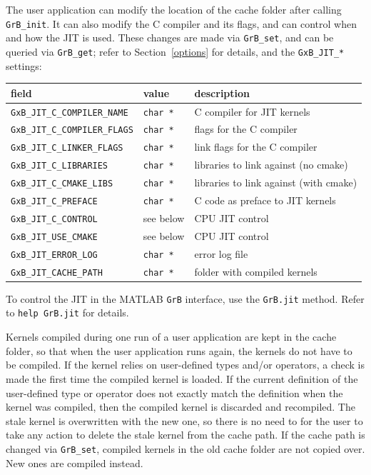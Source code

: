 The user application can modify the location of the cache folder after calling
\verb'GrB_init'.  It can also modify the C compiler and its flags, and can
control when and how the JIT is used.  These changes are made via
\verb'GrB_set', and can be queried via \verb'GrB_get'; refer to
Section~\ref{options} for details, and the \verb'GxB_JIT_*' settings:

\vspace{0.15in}
{\footnotesize
\begin{tabular}{lll}
\hline
field                       & value         & description \\
\hline
\verb'GxB_JIT_C_COMPILER_NAME' & \verb'char *' & C compiler for JIT kernels \\
\verb'GxB_JIT_C_COMPILER_FLAGS'& \verb'char *' & flags for the C compiler \\
\verb'GxB_JIT_C_LINKER_FLAGS' & \verb'char *' & link flags for the C compiler \\
\verb'GxB_JIT_C_LIBRARIES'    & \verb'char *' & libraries to link against (no cmake) \\
\verb'GxB_JIT_C_CMAKE_LIBS'   & \verb'char *' & libraries to link against (with cmake) \\
\verb'GxB_JIT_C_PREFACE'      & \verb'char *' & C code as preface to JIT kernels \\
\verb'GxB_JIT_C_CONTROL'      & see below     & CPU JIT control \\
\verb'GxB_JIT_USE_CMAKE'      & see below     & CPU JIT control \\
\verb'GxB_JIT_ERROR_LOG'      & \verb'char *' & error log file \\
\verb'GxB_JIT_CACHE_PATH'     & \verb'char *' & folder with compiled kernels \\
\hline
\end{tabular}
}
\vspace{0.15in}

To control the JIT in the MATLAB \verb'GrB' interface, use the \verb'GrB.jit'
method.  Refer to \verb'help GrB.jit' for details.

Kernels compiled during one run of a user application are kept in the cache
folder, so that when the user application runs again, the kernels do not have
to be compiled.  If the kernel relies on user-defined types and/or operators, a
check is made the first time the compiled kernel is loaded.  If the current
definition of the user-defined type or operator does not exactly match the
definition when the kernel was compiled, then the compiled kernel is discarded
and recompiled.  The stale kernel is overwritten with the new one, so there is
no need to for the user to take any action to delete the stale kernel from the
cache path.  If the cache path is changed via \verb'GrB_set', compiled kernels
in the old cache folder are not copied over.  New ones are compiled instead.

